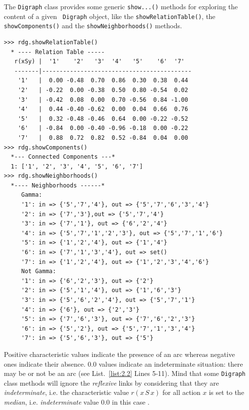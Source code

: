 The \texttt{Digraph} class provides some generic \texttt{show...()} methods for exploring the content of a given \texttt{ Digraph} object, like the \texttt{showRelationTable()}, the \texttt{showComponents()} and the \texttt{showNeighborhoods()} methods.
\begin{lstlisting}[caption={Example of random valuation digraph},label=list:2.2]
>>> rdg.showRelationTable()
  * ---- Relation Table -----
   r(xSy) |  '1'    '2'   '3'  '4'   '5'    '6'  '7'	  
   -------|-------------------------------------------
    '1'   |  0.00 -0.48  0.70  0.86  0.30  0.38  0.44	 
    '2'   | -0.22  0.00 -0.38  0.50  0.80 -0.54  0.02	 
    '3'   | -0.42  0.08  0.00  0.70 -0.56  0.84 -1.00	 
    '4'   |  0.44 -0.40 -0.62  0.00  0.04  0.66  0.76	 
    '5'   |  0.32 -0.48 -0.46  0.64  0.00 -0.22 -0.52	 
    '6'   | -0.84  0.00 -0.40 -0.96 -0.18  0.00 -0.22	 
    '7'   |  0.88  0.72  0.82  0.52 -0.84  0.04  0.00
>>> rdg.showComponents()
  *--- Connected Components ---*
  1: ['1', '2', '3', '4', '5', '6', '7']
>>> rdg.showNeighborhoods()
  *---- Neighborhoods ------*
     Gamma:
     '1': in => {'5','7','4'}, out => {'5','7','6','3','4'}
     '2': in => {'7','3'},out => {'5','7','4'}
     '3': in => {'7','1'}, out => {'6','2','4'}
     '4': in => {'5','7','1','2','3'}, out => {'5','7','1','6'}
     '5': in => {'1','2','4'}, out => {'1','4'}
     '6': in => {'7','1','3','4'}, out => set()
     '7': in => {'1','2','4'}, out => {'1','2','3','4','6'}
     Not Gamma:
     '1': in => {'6','2','3'}, out => {'2'}
     '2': in => {'5','1','4'}, out => {'1','6','3'}
     '3': in => {'5','6','2','4'}, out => {'5','7','1'}
     '4': in => {'6'}, out => {'2','3'}
     '5': in => {'7','6','3'}, out => {'7','6','2','3'}
     '6': in => {'5','2'}, out => {'5','7','1','3','4'}
     '7': in => {'5','6','3'}, out => {'5'}
\end{lstlisting}   

Positive characteristic values indicate the presence of an arc whereas negative ones indicate their absence. $0.0$ values indicate an indeterminate situation: there may be or not be an arc (see List.~\vref{list:2.2} Lines 5-11). Mind that some \texttt{Digraph} class methods will ignore the \emph{reflexive} links by considering that they are \emph{indeterminate}, i.e. the characteristic value $r(x\,S\,x)$ for all action $x$ is set to the \emph{median}, i.e. \emph{indeterminate} value $0.0$ in this case \citep{BIS-2004a}.

